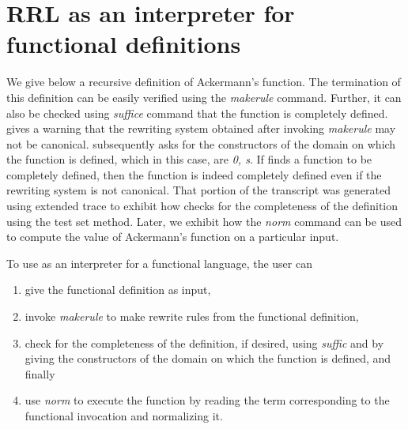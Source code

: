 \chapter{RRL as an interpreter for functional definitions}
\normalsize
\rm
We give below a recursive definition of Ackermann's function.  The
termination of this definition can be easily verified using the {\em
makerule} command. Further, it can also be checked using {\em suffice}
command that the function is completely defined.  \RRL gives a warning
that the rewriting system obtained after invoking {\em makerule} may
not be canonical. \RRL subsequently asks for the constructors of the
domain on which the function is defined, which in this case, are {\em
0, s}. If \RRL finds a function to be completely defined, then the
function is indeed completely defined even if the rewriting system is
not canonical.  That portion of the transcript was generated using
extended trace to exhibit how \RRL checks for the completeness of the
definition using the test set method.  Later, we exhibit how the {\em
norm} command can be used to compute the value of Ackermann's function
on a particular input.

To use \RRL as an interpreter for a functional language, the user can
\begin{enumerate}
\item give the functional definition as input, 
\item invoke {\em makerule} to make
rewrite rules from the functional definition,
\item check for the completeness of the definition, if desired, using
{\em suffic} and by giving the constructors of the domain on which the function
is defined, and finally
\item use {\em norm} to execute the function by reading the term corresponding
to the functional invocation and normalizing it.
\end{enumerate}


